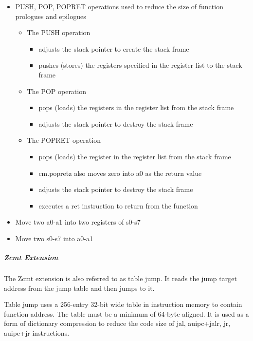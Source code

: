 \documentclass[main\_\_EN.tex]{subfiles}
\begin{document}
\begin{itemize}
    \item PUSH, POP, POPRET operations used to reduce the size of function prologues and epilogues
        \begin{itemize}
            \item The PUSH operation
                \begin{itemize}
                    \item adjusts the stack pointer to create the stack frame
                    \item pushes (stores) the registers specified in the register list to the stack frame
                \end{itemize}
            \item The POP operation
                \begin{itemize}
                    \item pops (loads) the registers in the register list from the stack frame
                    \item adjusts the stack pointer to destroy the stack frame
                \end{itemize}
            \item The POPRET operation
                \begin{itemize}
                    \item pops (loads) the register in the register list from the stack frame
                    \item cm.popretz also moves zero into a0 as the return value
                    \item adjusts the stack pointer to destroy the stack frame
                    \item executes a ret instruction to return from the function
                \end{itemize}
        \end{itemize}
    \item Move two a0-a1 into two registers of s0-s7
    \item Move two s0-s7 into a0-a1
\end{itemize}

\subparagraph{Zcmt Extension}

The Zcmt extension is also referred to as table jump. It reads the jump target address from the jump table and then jumps to it.

Table jump uses a 256-entry 32-bit wide table in instruction memory to contain function address. The table must be a minimum of 64-byte aligned. It is used as a form of dictionary compression to reduce the code size of jal, auipc+jalr, jr, auipc+jr instructions.
\end{document}

